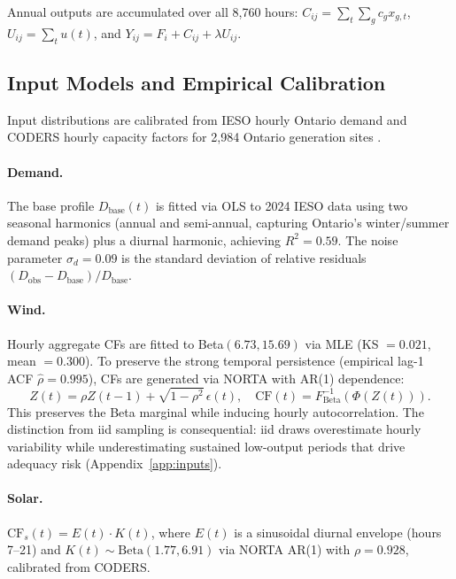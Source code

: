 \documentclass[11pt]{article}
\begin{document}
\vspace{0.5em}
Annual outputs are accumulated over all 8,760 hours: $C_{ij} = \sum_t \sum_g c_g x_{g,t}$, \; $U_{ij} = \sum_t u(t)$, \; and \; $Y_{ij} = F_i + C_{ij} + \lambda U_{ij}$.

\subsection{Input Models and Empirical Calibration}\label{sec:inputs}

Input distributions are calibrated from IESO hourly Ontario demand \citep{IESO2025} and CODERS hourly capacity factors for 2,984 Ontario generation sites \citep{CODERS2025}.

\paragraph{Demand.}
The base profile $D_{\text{base}}(t)$ is fitted via OLS to 2024 IESO data using two seasonal harmonics (annual and semi-annual, capturing Ontario's winter/summer demand peaks) plus a diurnal harmonic, achieving $R^2 = 0.59$. The noise parameter $\sigma_d = 0.09$ is the standard deviation of relative residuals $(D_{\text{obs}} - D_{\text{base}})/D_{\text{base}}$.

\paragraph{Wind.}
Hourly aggregate CFs are fitted to Beta$(6.73, 15.69)$ via MLE (KS $= 0.021$, mean $= 0.300$). To preserve the strong temporal persistence (empirical lag-1 ACF $\hat\rho = 0.995$), CFs are generated via NORTA with AR(1) dependence:
\begin{equation}\label{eq:norta}
  Z(t) = \rho Z(t{-}1) + \sqrt{1-\rho^2}\,\epsilon(t), \quad
  \text{CF}(t) = F_{\text{Beta}}^{-1}(\Phi(Z(t))).
\end{equation}
This preserves the Beta marginal while inducing hourly autocorrelation. The distinction from iid sampling is consequential: iid draws overestimate hourly variability while underestimating sustained low-output periods that drive adequacy risk (Appendix~\ref{app:inputs}).

\paragraph{Solar.}
$\text{CF}_s(t) = E(t) \cdot K(t)$, where $E(t)$ is a sinusoidal diurnal envelope (hours 7--21) and $K(t) \sim \text{Beta}(1.77, 6.91)$ via NORTA AR(1) with $\rho = 0.928$, calibrated from CODERS.
\end{document}
